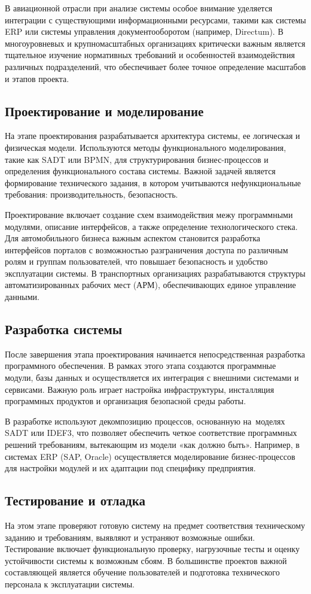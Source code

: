 \documentclass{ou}
\begin{document}
В авиационной отрасли при анализе системы особое внимание уделяется интеграции с существующими информационными ресурсами, такими как системы ERP или системы управления документооборотом (например, Directum). В многоуровневых и крупномасштабных организациях критически важным является тщательное изучение нормативных требований и особенностей взаимодействия различных подразделений, что обеспечивает более точное определение масштабов и этапов проекта.
\subsection{Проектирование и моделирование}
На этапе проектирования разрабатывается архитектура системы, ее логическая и физическая модели. Используются методы функционального моделирования, такие как SADT или BPMN, для структурирования бизнес-процессов и определения функционального состава системы. Важной задачей является формирование технического задания, в котором учитываются нефункциональные требования: производительность, безопасность.

Проектирование включает создание схем взаимодействия межу программными модулями, описание интерфейсов, а также определение технологического стека. Для автомобильного бизнеса важным аспектом становится разработка интерфейсов порталов с возможностью разграничения доступа по различным ролям и группам пользователей, что повышает безопасность и удобство эксплуатации системы. В транспортных организациях разрабатываются структуры автоматизированных рабочих мест (АРМ), обеспечивающих единое управление данными.
\subsection{Разработка системы}
После завершения этапа проектирования начинается непосредственная разработка программного обеспечения. В рамках этого этапа создаются программные модули, базы данных и осуществляется их интеграция с внешними системами и сервисами. Важную роль играет настройка инфраструктуры, инсталляция программных продуктов и организация безопасной среды работы.

В разработке используют декомпозицию процессов, основанную на~моделях SADT или IDEF3, что позволяет обеспечить четкое соответствие программных решений требованиям, вытекающим из модели «как должно быть». Например, в системах ERP (SAP, Oracle) осуществляется моделирование бизнес-процессов для настройки модулей и их адаптации под специфику предприятия.
\subsection{Тестирование и отладка}
На этом этапе проверяют готовую систему на предмет соответствия техническому заданию и требованиям, выявляют и устраняют возможные ошибки. Тестирование включает функциональную проверку, нагрузочные тесты и оценку устойчивости системы к возможным сбоям. В большинстве проектов важной составляющей является обучение пользователей и подготовка технического персонала к эксплуатации системы.
\end{document}
